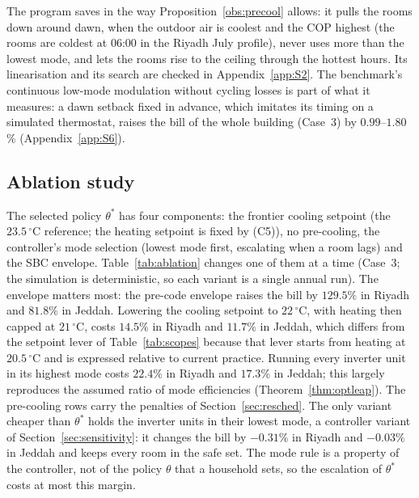 \documentclass[10pt,a4paper,twocolumn]{article}
\theoremstyle{definition}
\begin{document}
The program saves in the way Proposition~\ref{obs:precool} allows: it pulls the rooms down around dawn, when the outdoor air is coolest and the COP highest (the rooms are coldest at 06:00 in the Riyadh July profile), never uses more than the lowest mode, and lets the rooms rise to the ceiling through the hottest hours. Its linearisation and its search are checked in Appendix~\ref{app:S2}. The benchmark's continuous low-mode modulation without cycling losses is part of what it measures: a dawn setback fixed in advance, which imitates its timing on a simulated thermostat, raises the bill of the whole building (Case~3) by $0.99$--$1.80$\% (Appendix~\ref{app:S6}).

\subsection{Ablation study}\label{sec:ablation}
The selected policy $\theta^\ast$ has four components: the frontier cooling setpoint (the $23.5\,^{\circ}$C reference; the heating setpoint is fixed by (C5)), no pre-cooling, the controller's mode selection (lowest mode first, escalating when a room lags) and the SBC envelope. Table~\ref{tab:ablation} changes one of them at a time (Case~3; the simulation is deterministic, so each variant is a single annual run). The envelope matters most: the pre-code envelope raises the bill by $129.5\%$ in Riyadh and $81.8\%$ in Jeddah. Lowering the cooling setpoint to $22\,^{\circ}$C, with heating then capped at $21\,^{\circ}$C, costs $14.5\%$ in Riyadh and $11.7\%$ in Jeddah, which differs from the setpoint lever of Table~\ref{tab:scopes} because that lever starts from heating at $20.5\,^{\circ}$C and is expressed relative to current practice. Running every inverter unit in its highest mode costs $22.4\%$ in Riyadh and $17.3\%$ in Jeddah; this largely reproduces the assumed ratio of mode efficiencies (Theorem~\ref{thm:optleap}). The pre-cooling rows carry the penalties of Section~\ref{sec:resched}. The only variant cheaper than $\theta^\ast$ holds the inverter units in their lowest mode, a controller variant of Section~\ref{sec:sensitivity}: it changes the bill by $-0.31\%$ in Riyadh and $-0.03\%$ in Jeddah and keeps every room in the safe set. The mode rule is a property of the controller, not of the policy $\theta$ that a household sets, so the escalation of $\theta^\ast$ costs at most this margin.
\end{document}
